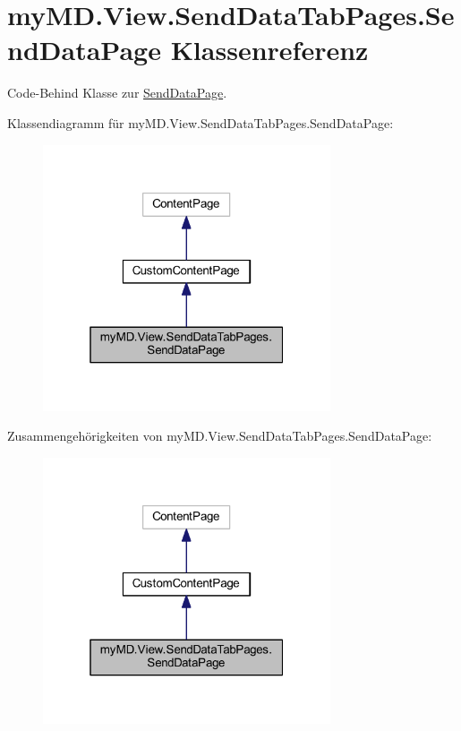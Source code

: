 \hypertarget{classmy_m_d_1_1_view_1_1_send_data_tab_pages_1_1_send_data_page}{}\section{my\+M\+D.\+View.\+Send\+Data\+Tab\+Pages.\+Send\+Data\+Page Klassenreferenz}
\label{classmy_m_d_1_1_view_1_1_send_data_tab_pages_1_1_send_data_page}


Code-\/\+Behind Klasse zur \mbox{\hyperlink{classmy_m_d_1_1_view_1_1_send_data_tab_pages_1_1_send_data_page}{Send\+Data\+Page}}.  




Klassendiagramm für my\+M\+D.\+View.\+Send\+Data\+Tab\+Pages.\+Send\+Data\+Page\+:
\nopagebreak
\begin{figure}[H]
\begin{center}
\leavevmode
\includegraphics[width=241pt]{classmy_m_d_1_1_view_1_1_send_data_tab_pages_1_1_send_data_page__inherit__graph}
\end{center}
\end{figure}


Zusammengehörigkeiten von my\+M\+D.\+View.\+Send\+Data\+Tab\+Pages.\+Send\+Data\+Page\+:
\nopagebreak
\begin{figure}[H]
\begin{center}
\leavevmode
\includegraphics[width=241pt]{classmy_m_d_1_1_view_1_1_send_data_tab_pages_1_1_send_data_page__coll__graph}
\end{center}
\end{figure}
